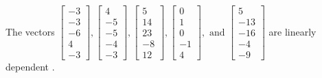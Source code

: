 \begin{exercise}
\begin{exerciseStatement}
  \end{exerciseStatement}
  \begin{exerciseAnswer}
   The vectors \(\left[\begin{array}{r}
-3 \\
-3 \\
-6 \\
4 \\
-3
\end{array}\right] , \left[\begin{array}{r}
4 \\
-5 \\
-5 \\
-4 \\
-3
\end{array}\right] , \left[\begin{array}{r}
5 \\
14 \\
23 \\
-8 \\
12
\end{array}\right] , \left[\begin{array}{r}
0 \\
1 \\
0 \\
-1 \\
4
\end{array}\right] , \text{ and } \left[\begin{array}{r}
5 \\
-13 \\
-16 \\
-4 \\
-9
\end{array}\right]\) are 
  	 linearly dependent  .
  


  \end{exerciseAnswer}
\end{exercise}